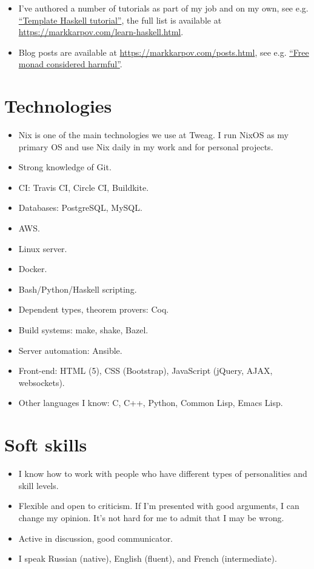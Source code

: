 \documentclass[a4paper,12pt]{article}
\begin{document}
\begin{itemize}[noitemsep]
\item I've authored a number of tutorials as part of my job and on my own,
  see e.g. \href{https://markkarpov.com/tutorial/th.html}{“Template Haskell
    tutorial”}, the full list is available at \\
  \href{https://markkarpov.com/learn-haskell.html}{https://markkarpov.com/learn-haskell.html}.
\item Blog posts are available at
  \href{https://markkarpov.com/posts.html}{https://markkarpov.com/posts.html},
  see e.g.
  \href{https://markkarpov.com/post/free-monad-considered-harmful.html}{“Free
    monad considered harmful”}.
\end{itemize}

\section*{Technologies}

\begin{itemize}[noitemsep]
\item Nix is one of the main technologies we use at Tweag. I run NixOS as my
  primary OS and use Nix daily in my work and for personal projects.
\item Strong knowledge of Git.
\item CI: Travis CI, Circle CI, Buildkite.
\item Databases: PostgreSQL, MySQL.
\item AWS.
\item Linux server.
\item Docker.
\item Bash/Python/Haskell scripting.
\item Dependent types, theorem provers: Coq.
\item Build systems: make, shake, Bazel.
\item Server automation: Ansible.
\item Front-end: HTML (5), CSS (Bootstrap), JavaScript (jQuery, AJAX,
  websockets).
\item Other languages I know: C, C++, Python, Common Lisp, Emacs Lisp.
\end{itemize}

\section*{Soft skills}

\begin{itemize}[noitemsep]
\item I know how to work with people who have different types of
  personalities and skill levels.
\item Flexible and open to criticism. If I'm presented with good arguments,
  I can change my opinion. It's not hard for me to admit that I may be
  wrong.
\item Active in discussion, good communicator.
\item I speak Russian (native), English (fluent), and French (intermediate).
\end{itemize}
\end{document}
